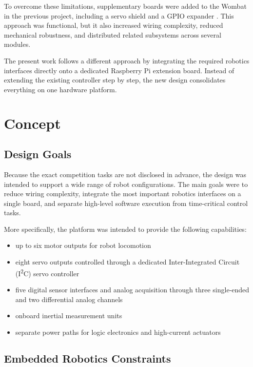 \documentclass[conference]{IEEEtran}
\begin{document}
	To overcome these limitations, supplementary boards were added to the Wombat in the previous project, including a servo shield and a GPIO expander \cite{b2}. This approach was functional, but it also increased wiring complexity, reduced mechanical robustness, and distributed related subsystems across several modules.
	
	The present work follows a different approach by integrating the required robotics interfaces directly onto a dedicated Raspberry Pi extension board. Instead of extending the existing controller step by step, the new design consolidates everything on one hardware platform.
	
	\section{Concept}
	
	\subsection{Design Goals}
	
	Because the exact competition tasks are not disclosed in advance, the design was intended to support a wide range of robot configurations. The main goals were to reduce wiring complexity, integrate the most important robotics interfaces on a single board, and separate high-level software execution from time-critical control tasks.
	
	More specifically, the platform was intended to provide the following capabilities:
	
	\begin{itemize}
		\item up to six motor outputs for robot locomotion
		\item eight servo outputs controlled through a dedicated Inter-Integrated Circuit (I\textsuperscript{2}C) servo controller \cite{b9}
		\item five digital sensor interfaces and analog acquisition through three single-ended and two differential analog channels
		\item onboard inertial measurement units
		\item separate power paths for logic electronics and high-current actuators
	\end{itemize}
	
	\subsection{Embedded Robotics Constraints}
	
\end{document}
